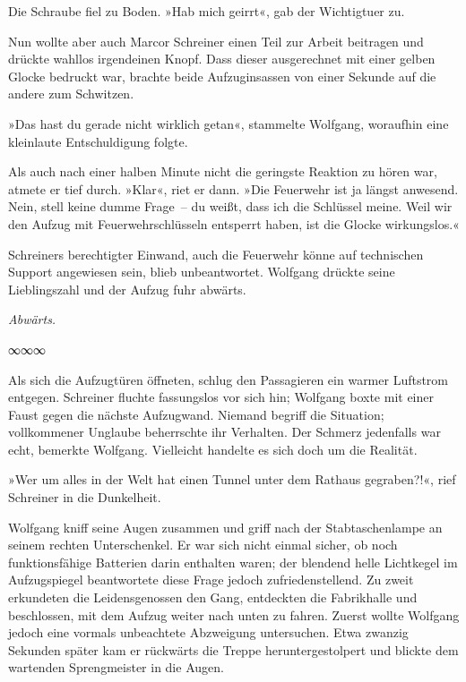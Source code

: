 Die Schraube fiel zu Boden. »Hab mich geirrt«, gab der Wichtigtuer zu.

Nun wollte aber auch Marcor Schreiner einen Teil zur Arbeit beitragen und drückte wahllos irgendeinen Knopf. Dass dieser ausgerechnet mit einer gelben Glocke bedruckt war, brachte beide Aufzuginsassen von einer Sekunde auf die andere zum Schwitzen.

»Das hast du gerade nicht wirklich getan«, stammelte Wolfgang, woraufhin eine kleinlaute Entschuldigung folgte.

Als auch nach einer halben Minute nicht die geringste Reaktion zu hören war, atmete er tief durch. »Klar«, riet er dann. »Die Feuerwehr ist ja längst anwesend. Nein, stell keine dumme Frage~– du weißt, dass ich die Schlüssel meine. Weil wir den Aufzug mit Feuerwehrschlüsseln entsperrt haben, ist die Glocke wirkungslos.«

Schreiners berechtigter Einwand, auch die Feuerwehr könne auf technischen Support angewiesen sein, blieb unbeantwortet. Wolfgang drückte seine Lieblingszahl und der Aufzug fuhr abwärts.

\emph{Abwärts.}

\begin{center}
∞∞∞
\end{center}


Als sich die Aufzugtüren öffneten, schlug den Passagieren ein warmer Luftstrom entgegen. Schreiner fluchte fassungslos vor sich hin; Wolfgang boxte mit einer Faust gegen die nächste Aufzugwand. Niemand begriff die Situation; vollkommener Unglaube beherrschte ihr Verhalten. Der Schmerz jedenfalls war echt, bemerkte Wolfgang. Vielleicht handelte es sich doch um die Realität.

»Wer um alles in der Welt hat einen Tunnel unter dem Rathaus gegraben?!«, rief Schreiner in die Dunkelheit.

Wolfgang kniff seine Augen zusammen und griff nach der Stabtaschenlampe an seinem rechten Unterschenkel. Er war sich nicht einmal sicher, ob noch funktionsfähige Batterien darin enthalten waren; der blendend helle Lichtkegel im Aufzugspiegel beantwortete diese Frage jedoch zufriedenstellend. Zu zweit erkundeten die Leidensgenossen den Gang, entdeckten die Fabrikhalle und beschlossen, mit dem Aufzug weiter nach unten zu fahren. Zuerst wollte Wolfgang jedoch eine vormals unbeachtete Abzweigung untersuchen. Etwa zwanzig Sekunden später kam er rückwärts die Treppe heruntergestolpert und blickte dem wartenden Sprengmeister in die Augen.

